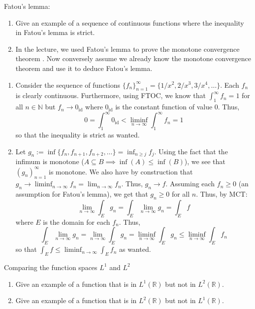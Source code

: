 \documentclass[12pt]{article}
\newenvironment{solution}[2][Solution]{\begin{trivlist}
\item[\hskip \labelsep {\bfseries #1}]}{\end{trivlist}}
\newenvironment{problem}[2][Problem]{\begin{trivlist}
\item[\hskip \labelsep {\bfseries #1}\hskip \labelsep {\bfseries #2.}]}{\end{trivlist}}
\begin{document}
\begin{problem}{5}
    Fatou's lemma:
    \begin{enumerate}
        \item Give an example of a sequence of continuous functions where the inequality in Fatou's lemma is strict.
        \item In the lecture, we used Fatou's lemma to prove the monotone convergence theorem . Now conversely assume we already
            know the monotone convergence theorem and use it to deduce Fatou's lemma.
    \end{enumerate}
\end{problem}

\begin{solution}{}
	\begin{enumerate}
		\item[(i.)] Consider the sequence of functions $\{f_n\}_{n=1}^{\infty} = \{1/x^2, 2/x^3, 3/x^4, \hdots\}$. Each $f_n$ is clearly continuous. Furthermore, using
		FTOC, we know that $\int_1^{\infty} f_n = 1$ for all $n\in\mathbb{N}$ but $f_n \to 0_{\text{id}}$ where $0_{\text{id}}$ is the constant function of value 0. Thus,
		\[ 0 = \int_1^{\infty} 0_{\text{id}} < \liminf_{n\to\infty} \int_1^{\infty} f_n = 1 \]
		so that the inequality is strict as wanted.
		\item[(ii.)] Let $g_n := \inf\{f_n, f_{n+1},f_{n+2},\hdots\} = \inf_{n\geq j} f_j$. Using the fact that the infimum is monotone ($A\subseteq B\implies \inf(A)\leq \inf(B)$), we see
		that $(g_n)_{n=1}^{\infty}$ is monotone. We also have by construction that $g_n \to \liminf_{n\to\infty} f_n = \lim_{n\to\infty} f_n$. Thus, $g_n\to f$. Assuming each $f_n\geq 0$ 
		(an assumption for Fatou's lemma), we get that $g_n\geq 0$ for all $n$. Thus, by MCT:
		\[ \lim_{n\to\infty} \int_E g_n = \int_E \lim_{n\to\infty} g_n = \int_E f \]
		where $E$ is the domain for each $f_n$. Thus,
		\[ \int_E \lim_{n\to\infty} g_n = \lim_{n\to\infty} \int_E g_n = \liminf_{n\to\infty} \int_E g_n \leq \liminf_{n\to\infty} \int_E f_n\]
		so that $\int_E f \leq \liminf_{n\to\infty} \int_E f_n$ as wanted.
	\end{enumerate}
\end{solution}

\newpage
\begin{problem}{6}
    Comparing the function spaces $L^1$ and $L^2$
    \begin{enumerate}
        \item Give an example of a function that is in $L^1(\mathbb{R})$ but not in $L^2(\mathbb{R})$.
        \item Give an example of a function that is in $L^2(\mathbb{R})$ but not in $L^1(\mathbb{R})$.
    \end{enumerate}
\end{problem}
\end{document}
